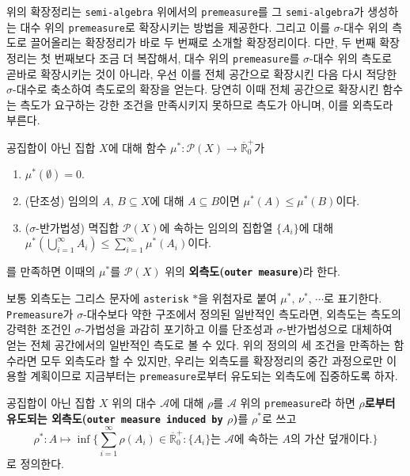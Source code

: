 위의 확장정리는 \texttt{semi-algebra} 위에서의 \texttt{premeasure}를 그 \texttt{semi-algebra}가 생성하는 대수 위의 \texttt{premeasure}로 확장시키는 방법을 제공한다. 그리고 이를 $\sigma$-대수 위의 측도로 끌어올리는 확장정리가 바로 두 번째로 소개할 확장정리이다. 다만, 두 번째 확장정리는 첫 번째보다 조금 더 복잡해서, 대수 위의 \texttt{premeasure}를 $\sigma$-대수 위의 측도로 곧바로 확장시키는 것이 아니라, 우선 이를 전체 공간으로 확장시킨 다음 다시 적당한 $\sigma$-대수로 축소하여 측도로의 확장을 얻는다. 당연히 이때 전체 공간으로 확장시킨 함수는 측도가 요구하는 강한 조건을 만족시키지 못하므로 측도가 아니며, 이를 외측도라 부른다.

\begin{definition}
    공집합이 아닌 집합 $X$에 대해 함수 $\mu^*:\mathcal{P}(X)\to\overline{\mathbb{R}}^+_0$가
    \begin{enumerate}
        \item $\mu^*(\emptyset)=0$.
        \item (단조성) 임의의 $A,\,B\subseteq X$에 대해 $A\subseteq B$이면 $\mu^*(A)\leq\mu^*(B)$이다.
        \item ($\sigma$-반가법성) 멱집합 $\mathcal{P}(X)$에 속하는 임의의 집합열 $\{A_i\}$에 대해 $\mu^*(\bigcup_{i=1}^\infty A_i)\leq\sum_{i=1}^\infty\mu^*(A_i)$이다.
    \end{enumerate}
    를 만족하면 이때의 $\mu^*$를 $\mathcal{P}(X)$ 위의 \textbf{외측도(\texttt{outer measure})}라 한다.
\end{definition}

보통 외측도는 그리스 문자에 \texttt{asterisk} $*$을 위첨자로 붙여 $\mu^*,\,\nu^*,\,\cdots$로 표기한다. \texttt{Premeasure}가 $\sigma$-대수보다 약한 구조에서 정의된 일반적인 측도라면, 외측도는 측도의 강력한 조건인 $\sigma$-가법성을 과감히 포기하고 이를 단조성과 $\sigma$-반가법성으로 대체하여 얻는 전체 공간에서의 일반적인 측도로 볼 수 있다. 위의 정의의 세 조건을 만족하는 함수라면 모두 외측도라 할 수 있지만, 우리는 외측도를 확장정리의 중간 과정으로만 이용할 계획이므로 지금부터는 \texttt{premeasure}로부터 유도되는 외측도에 집중하도록 하자.

\begin{definition}
    공집합이 아닌 집합 $X$ 위의 대수 $\mathcal{A}$에 대해 $\rho$를 $\mathcal{A}$ 위의 \texttt{premeasure}라 하면 \textbf{$\rho$로부터 유도되는 외측도(\texttt{outer measure induced by} $\rho$)}를 $\rho^*$로 쓰고
    \begin{equation*}
        \rho^*:A\mapsto\inf\bigg\{\sum_{i=1}^\infty\rho(A_i)\in\overline{\mathbb{R}}^+_0:\{A_i\}\textrm{는 $\mathcal{A}$에 속하는 $A$의 가산 덮개이다.}\bigg\}
    \end{equation*}
      로 정의한다.
\end{definition}

